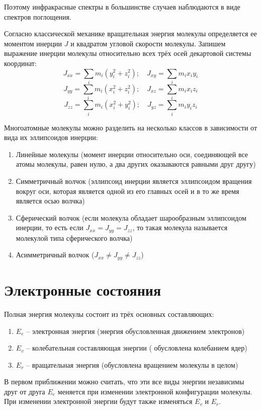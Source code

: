 Поэтому инфракрасные спектры в большинстве случаев наблюдаются в
виде спектров поглощения.

Согласно классической механике вращательная энергия молекулы
определяется ее моментом инерции \( J \) и квадратом угловой скорости
молекулы. Запишем выражение инерции молекулы относительно всех трёх 
осей декартовой системы координат:
\[ 
	J_{xx} = \sum_i m_i\left( y^2_i + z^2_i \right);\quad
	J_{xy} = \sum_i m_i x_i y_i
\]
\[ 
	J_{yy} = \sum_i m_i\left( x^2_i + z^2_i \right);\quad
	J_{xz} = \sum_i m_i x_i z_i
\]
\[ 
	J_{zz} = \sum_i m_i\left( x^2_i + y^2_i \right);\quad
	J_{yz} = \sum_i m_i y_i z_i
\]

Многоатомные молекулы можно разделить на несколько классов в
зависимости от вида их эллипсоидов инерции:
\begin{enumerate}
	\item Линейные молекулы (момент инерции относительно оси, 
		соединяющей все атомы молекулы, равен нулю, а два 
		других оказываются равными друг другу)
	\item Симметричный волчок (эллипсоид инерции является эллипсоидом
		вращения вокруг оси, которая является одной из его главных осей 
		и в то же время является осью волчка)
	\item Сферический волчок (если молекула обладает шарообразным
		эллипсоидом инерции, то есть если \( J_{xx} = J_{yy} = J_{zz}\), 
		то такая молекула называется молекулой типа сферического волчка)
	\item Асимметричный волчок (\( J_{xx} \neq J_{yy} \neq J_{zz} \))
\end{enumerate}

\section{Электронные состояния}
Полная энергия молекулы состоит из трёх основных составляющих:
\begin{enumerate}
	\item \( E_e \) -- электронная энергия (энергия обусловленная 
		движением электронов)
	\item \( E_v \) -- колебательная составляющая энергии (
		обусловлена колебанием ядер)
	\item \( E_r \) -- вращательная энергия (обусловлена вращением 
		молекулы в целом)
\end{enumerate}
В первом приближении можно считать, что эти все виды энергии независимы 
друг от друга \( E_e \) меняется при изменении электронной конфигурации 
молекулы. При изменении электронной энергии будут также изменяться 
\( E_v \) и  \( E_r \).

